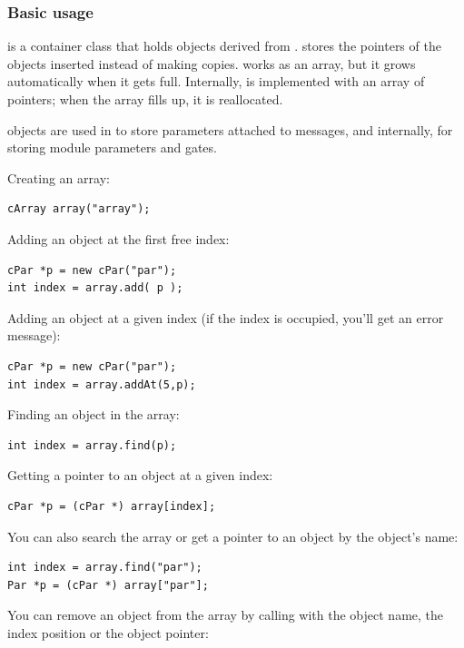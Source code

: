\subsubsection{Basic usage}


 is a container class that holds objects derived from
.  stores the pointers of the objects
inserted instead of making copies.  works as an array,
but it grows automatically when it gets full. Internally,
 is implemented with an array of pointers; when the array
fills up, it is reallocated.

 objects are used in {\opp} to store parameters
attached to messages, and internally, for storing module parameters
and gates.


Creating an array:

\begin{verbatim}
cArray array("array");
\end{verbatim}

Adding an object at the first free index:

\begin{verbatim}
cPar *p = new cPar("par");
int index = array.add( p );
\end{verbatim}


Adding an object at a given index (if the index is occupied,
you'll get an error message):

\begin{verbatim}
cPar *p = new cPar("par");
int index = array.addAt(5,p);
\end{verbatim}


Finding an object in the array:

\begin{verbatim}
int index = array.find(p);
\end{verbatim}

Getting a pointer to an object at a given index:

\begin{verbatim}
cPar *p = (cPar *) array[index];
\end{verbatim}

You can also search the array or get a pointer to an object by
the object's name:

\begin{verbatim}
int index = array.find("par");
Par *p = (cPar *) array["par"];
\end{verbatim}


You can remove an object from the array by calling 
with the object name, the index position or the object pointer:

